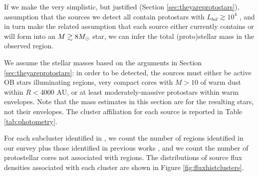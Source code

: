 \documentclass[twocolumn]{aastex61}
\begin{document}
If we make the very simplistic, but justified (Section
\ref{sec:theyareprotostars}), assumption that the sources we detect all contain
protostars with $L_{bol}\gtrsim10^4$ \lsun, and in turn make the related
assumption that each source either currently contains or will form into an
$M\gtrsim8 M_{\odot}$ star, we can infer the total (proto)stellar mass in the
observed region.


We assume the
stellar masses based on the arguments in Section \ref{sec:theyareprotostars}:
in order to be detected, the sources must either be active OB stars
illuminating \hii regions, very compact cores with
$M>10$ \msun of warm dust within $R<4000$ AU, or
at least moderately-massive protostars within warm envelopes.  Note that the
mass estimates in this section are for the resulting stars, not their
envelopes.  The cluster affiliation for each source is reported in Table
\ref{tab:photometry}.




For each subcluster identified in \citet[][see Figure
\ref{fig:overview}]{Schmiedeke2016a}, we count the number of \hii regions
identified in our survey plus those identified in previous works
\citep{Gaume1995a,De-Pree1996a}, and we count the number of protostellar cores
not associated with \hii regions.  The distributions of source flux densities
associated with each cluster are shown in Figure \ref{fig:fluxhistclusters}.
\end{document}

